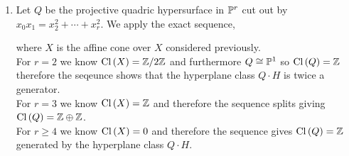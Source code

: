\documentclass[12pt]{article}
\begin{document}
\begin{enumerate}
\item Let $Q$ be the projective quadric hypersurface in $\P^r$ cut out by $x_0 x_1 = x_2^2 + \cdots + x_r^2$. We apply the exact sequence,
\begin{center}
\end{center}
where $X$ is the affine cone over $X$ considered previously. 
\bigskip\\
For $r = 2$ we know $\Cl{X} = \Z / 2 \Z$ and furthermore $Q \cong \P^1$ so $\Cl{Q} = \Z$ therefore the seqeunce shows that the hyperplane class $Q \cdot H$ is twice a generator.
\bigskip\\
For $r = 3$ we know $\Cl{X} = \Z$ and therefore the sequence splits giving $\Cl{Q} = \Z \oplus \Z$.
\bigskip\\
For $r \ge 4$ we know $\Cl{X} = 0$ and therefore the sequence gives $\Cl{Q} = \Z$ generated by the hyperplane class $Q \cdot H$.


\end{enumerate}
\end{document}
